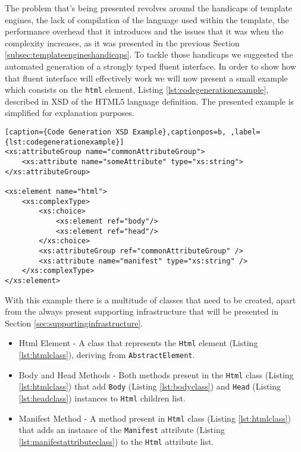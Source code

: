 The problem that's being presented revolves around the handicaps of template engines, the lack of compilation of the language used within the template, the performance overhead that it introduces and the issues that it was when the complexity increases, as it was presented in the previous Section \ref{subsec:templateengineshandicaps}. To tackle those handicaps we suggested the automated generation of a strongly typed fluent interface. In order to show how that fluent interface will effectively work we will now present a small example which consists on the \texttt{html} element, Listing \ref{lst:codegenerationexample}, described in \ac{XSD} of the \ac{HTML}5 language definition. The presented example is simplified for explanation purposes.

\bigskip


\begin{minipage}{\linewidth}
\begin{lstlisting}[caption={Code Generation XSD Example},captionpos=b, ,label={lst:codegenerationexample}]
<xs:attributeGroup name="commonAttributeGroup">
    <xs:attribute name="someAttribute" type="xs:string">
</xs:attributeGroup>

<xs:element name="html">
    <xs:complexType>
        <xs:choice>
            <xs:element ref="body"/>
            <xs:element ref="head"/>
        </xs:choice>
        <xs:attributeGroup ref="commonAttributeGroup" />
        <xs:attribute name="manifest" type="xs:string" />
    </xs:complexType>
</xs:element>
\end{lstlisting}
\end{minipage}

\noindent
With this example there is a multitude of classes that need to be created, apart from the always present supporting infrastructure that will be presented in Section \ref{sec:supportinginfrastructure}. 

\begin{itemize}
	\item Html Element - A class that represents the \texttt{Html} element (Listing \ref{lst:htmlclass}), deriving from \texttt{AbstractElement}.
	\item Body and Head Methods - Both methods present in the \texttt{Html} class (Listing \ref{lst:htmlclass}) that add \texttt{Body} (Listing \ref{lst:bodyclass}) and \texttt{Head} (Listing \ref{lst:headclass}) instances to \texttt{Html} children list.
	\item Manifest Method - A method present in \texttt{Html} class (Listing \ref{lst:htmlclass}) that adds an instance of the \texttt{Manifest} attribute (Listing \ref{lst:manifestattributeclass}) to the \texttt{Html} attribute list.
\end{itemize}

